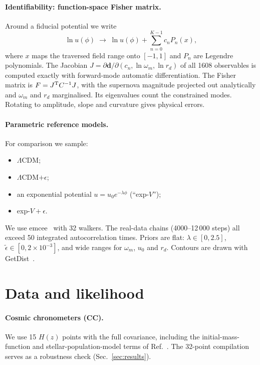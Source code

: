 \documentclass[11pt,a4paper]{article}
\newcommand{\et}{\tilde\epsilon}
\begin{document}
\paragraph{Identifiability: function-space Fisher matrix.} Around a fiducial potential we write
\begin{equation}
\ln u(\phi)\;\to\;\ln u(\phi)+\sum_{n=0}^{K-1}c_n P_n(x),
\end{equation}
where $x$ maps the traversed field range onto $[-1,1]$ and $P_n$ are Legendre polynomials. The Jacobian $J=\partial\bm d/\partial(c_n,\ln\omega_m,\ln r_d)$ of all 1608 observables is computed exactly with forward-mode automatic differentiation. The Fisher matrix is $F=J^{\rm T}C^{-1}J$, with the supernova magnitude projected out analytically and $\omega_m$ and $r_d$ marginalised. Its eigenvalues count the constrained modes. Rotating to amplitude, slope and curvature gives physical errors.

\paragraph{Parametric reference models.} For comparison we sample:
\begin{itemize}
\item $\Lambda$CDM;
\item $\Lambda$CDM$+\epsilon$;
\item an exponential potential $u=u_0e^{-\lambda\phi}$ (``exp-$V$'');
\item exp-$V+\epsilon$.
\end{itemize}
We use emcee~\cite{1202.3665} with 32 walkers. The real-data chains (4000--12\,000 steps) all exceed 50 integrated autocorrelation times. Priors are flat: $\lambda\in[0,2.5]$, $\et\in[0,2\times10^{-3}]$, and wide ranges for $\omega_m$, $u_0$ and $r_d$. Contours are drawn with GetDist~\cite{1910.13970}.

\section{Data and likelihood}\label{sec:data}
\paragraph{Cosmic chronometers (CC).} We use 15 $H(z)$ points with the full covariance, including the initial-mass-function and stellar-population-model terms of Ref.~\cite{2003.07362}. The 32-point compilation~\cite{2201.07241} serves as a robustness check (Sec.~\ref{sec:results}).
\end{document}
